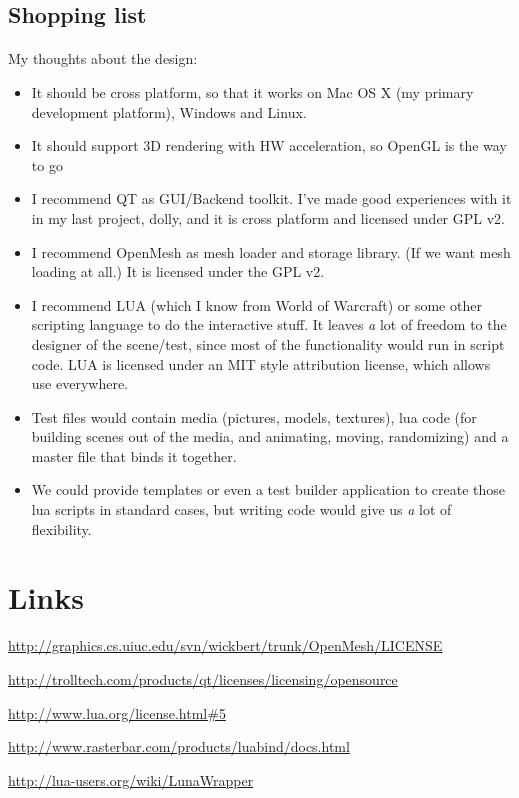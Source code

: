 \documentclass[11pt]{scrartcl}
\begin{document}
\begin{multicols}{2}
\section{Shopping list}
\paragraph{}

My thoughts about the design:
\begin{itemize}
\item It should be cross platform, so that it works on Mac OS X (my primary development platform), Windows and Linux.
\item It should support 3D rendering with HW acceleration, so OpenGL is the way to go
\item I recommend QT as GUI/Backend toolkit. I've made good experiences with it in my last project, dolly, and it is cross platform and licensed under GPL v2.
\item I recommend OpenMesh as mesh loader and storage library. (If we want mesh loading at all.) It is licensed under the GPL v2.
\item I recommend LUA (which I know from World of Warcraft) or some other scripting language to do the interactive stuff. It leaves {\textit a lot} of freedom to the designer of the scene/test, since most of the functionality would run in script code. LUA is licensed under an MIT style attribution license, which allows use everywhere.
\item Test files would contain media (pictures, models, textures), lua code (for building scenes out of the media, and animating, moving, randomizing) and a master file that binds it together.
\item We could provide templates or even a test builder application to create those lua scripts in standard cases, but writing code would give us {\textit a lot} of flexibility.
\end{itemize}

\end{multicols}

\appendix

\section{Links}
\url{http://graphics.cs.uiuc.edu/svn/wickbert/trunk/OpenMesh/LICENSE}

\url{http://trolltech.com/products/qt/licenses/licensing/opensource}

\url{http://www.lua.org/license.html#5}

\url{http://www.rasterbar.com/products/luabind/docs.html}

\url{http://lua-users.org/wiki/LunaWrapper}
\end{document}
